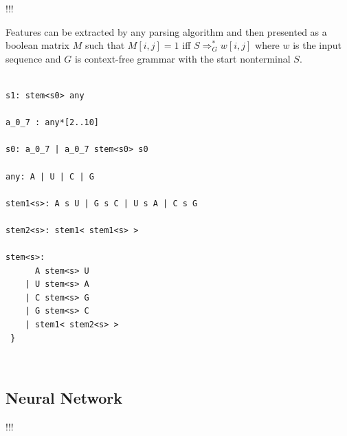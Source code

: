 \documentclass[a4paper,twoside]{article}
\begin{document}
\noindent !!!

Features can be extracted by any parsing algorithm and then presented as a boolean matrix $M$ such that $M[i,j]=1$ iff $S \Rightarrow^*_G w[i,j]$ where $w$ is the input sequence and $G$ is context-free grammar with the start nonterminal $S$.



\begin{verbatim}

s1: stem<s0> any

a_0_7 : any*[2..10]

s0: a_0_7 | a_0_7 stem<s0> s0

any: A | U | C | G

stem1<s>: A s U | G s C | U s A | C s G 

stem2<s>: stem1< stem1<s> >

stem<s>:  
      A stem<s> U 
    | U stem<s> A 
    | C stem<s> G 
    | G stem<s> C 
    | stem1< stem2<s> >  
 } 
\end{verbatim}

{\centering
  \
  \
  }


\subsection{Neural Network}

\noindent !!!


\end{document}

